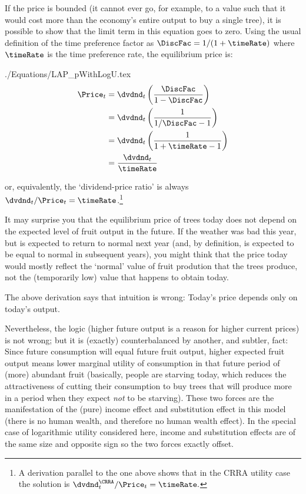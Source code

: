 \documentclass{handout}
\begin{document}
If the price is bounded (it cannot ever go, for 
example, to a value such that it would cost more than the economy's 
entire output to buy a single tree), it is possible to show that the limit term 
in this equation goes to zero.  Using the usual definition of the time preference factor
as $\DiscFac = 1/(1+\timeRate)$ where $\timeRate$ is the time preference rate, the equilibrium price is:
\begin{verbatimwrite}{./Equations/LAP_pWithLogU.tex}
\begin{equation}\begin{gathered}\begin{aligned}
 \Price_{t} & =  \dvdnd_{t}\left(\frac{\DiscFac}{1-\DiscFac} \right) \notag 
\\  & =  \dvdnd_{t}\left(\frac{1}{1/\DiscFac-1} \right) \notag 
\\  & =  \dvdnd_{t}\left(\frac{1}{1+\timeRate-1} \right) \notag
\\  & =  \frac{\dvdnd_{t}}{\timeRate} \label{eq:pWithLogU}
\end{aligned}\end{gathered}\end{equation}
\end{verbatimwrite}

or, equivalently, the `dividend-price ratio' is always $\dvdnd_{t}/\Price_{t} = \timeRate$.\footnote{A derivation parallel to the one above shows that in the CRRA utility case the solution is $\dvdnd_{t}^{\CRRA}/\Price_{t} = \timeRate.$}

It may surprise you that the equilibrium price of trees today does not depend on the expected level of fruit output in the future.  If the weather was bad this year, but is expected to return to normal next year (and, by definition, is expected to be equal to normal in subsequent years), you might think that the price today would mostly reflect the `normal' value of fruit prodution that the trees produce, not the (temporarily low) value that happens to obtain today.

The above derivation says that intuition is wrong: Today's price depends only on today's output.

Nevertheless, the logic (higher future output is a reason for higher current prices) is not wrong; but it is (exactly) counterbalanced by another, and subtler, fact: Since future consumption will equal future fruit output, higher expected fruit output means lower marginal utility of consumption in that future period of (more) abundant fruit (basically, people are starving today, which reduces the attractiveness of cutting their consumption to buy trees that will produce more in a period when they expect \textit{not} to be starving).  These two forces are the manifestation of the (pure) income effect and substitution effect in this model (there is no human wealth, and therefore no human wealth effect).  In the special case of logarithmic utility considered here, income and substitution effects are of the same size and opposite sign so the two forces exactly offset.
\end{document}
